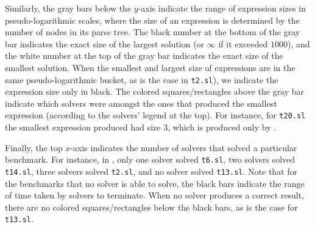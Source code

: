 Similarly, the gray bars below the $y$-axis indicate the range of expression sizes in pseudo-logarithmic scales,
where the size of an expression is determined by the number of nodes in its parse tree.
The black number at the bottom of the gray bar indicates the exact size of the largest solution (or $\infty$ if it exceeded $1000$),
and the white number at the top of the gray bar indicates the exact size of the smallest solution.
When the smallest and largest size of expressions are in the same pseudo-logarithmic bucket, as is the case in \texttt{t2.sl}),
we indicate the expression size only in black.
The colored squares/rectangles above the gray bar indicate which solvers were amongst the ones that produced the smallest expression
(according to the solvers' legend at the top).
For instance, for \texttt{t20.sl} the smallest expression produced had size $3$,
which is produced only by \eusolvernew.

Finally, the top $x$-axis indicates the number of solvers that solved a particular benchmark.
For instance, in , only one solver solved \texttt{t6.sl}, two solvers solved \texttt{t14.sl},
three solvers solved \texttt{t2.sl}, and no solver solved \texttt{t13.sl}.
Note that for the benchmarks that no solver is able to solve, the black bars indicate the range of time taken by solvers to terminate.
When no solver produces a correct result, there are no colored squares/rectangles below the black bars, as is the case for \texttt{t13.sl}.


